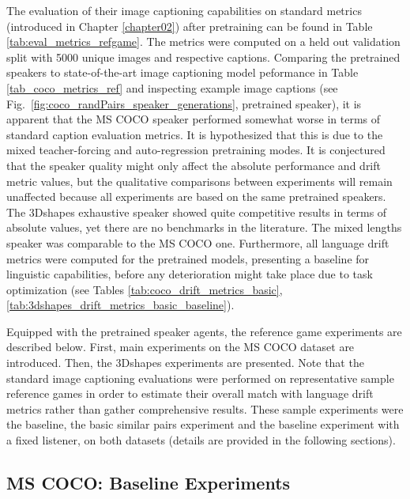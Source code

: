 The evaluation of their image captioning capabilities on standard metrics (introduced in Chapter \ref{chapter02}) after pretraining can be found in Table \ref{tab:eval_metrics_refgame}. The metrics were computed on a held out validation split with 5000 unique images and respective captions. Comparing the pretrained speakers to state-of-the-art image captioning model peformance in Table \ref{tab_coco_metrics_ref} and inspecting example image captions (see Fig.~\ref{fig:coco_randPairs_speaker_generations}, pretrained speaker), it is apparent that the MS COCO speaker performed somewhat worse in terms of standard caption evaluation metrics. It is hypothesized that this is due to the mixed teacher-forcing and auto-regression pretraining modes. It is conjectured that the speaker quality might only affect the absolute performance and drift metric values, but the qualitative comparisons between experiments will remain unaffected because all experiments are based on the same pretrained speakers. The 3Dshapes exhaustive speaker showed quite competitive results in terms of absolute values, yet there are no benchmarks in the literature. The mixed lengths speaker was comparable to the MS COCO one.
Furthermore, all language drift metrics were computed for the pretrained models, presenting a baseline for linguistic capabilities, before any deterioration might take place due to task optimization (see Tables \ref{tab:coco_drift_metrics_basic}, \ref{tab:3dshapes_drift_metrics_basic_baseline}).

Equipped with the pretrained speaker agents, the reference game experiments are described below. First, main experiments on the MS COCO dataset are introduced. Then, the 3Dshapes experiments are presented. Note that the standard image captioning evaluations were performed on representative sample reference games in order to estimate their overall match with language drift metrics rather than gather comprehensive results. These sample experiments were the baseline, the basic similar pairs experiment and the baseline experiment with a fixed listener, on both datasets (details are provided in the following sections).

\subsection{MS COCO: Baseline Experiments}
\label{expt:coco_baseline}

